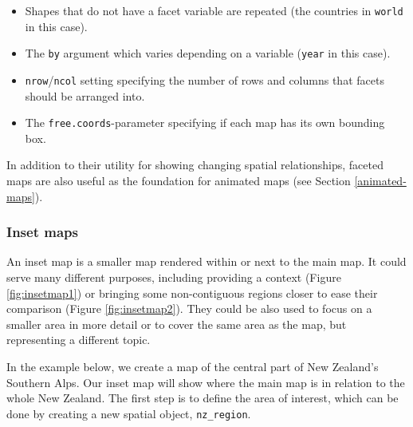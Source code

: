 \documentclass[]{krantz}
\newenvironment{Shaded}{\begin{snugshade}}{\end{snugshade}}
\newcommand{\DataTypeTok}[1]{\textcolor[rgb]{0.27,0.27,0.27}{#1}}
\newcommand{\DecValTok}[1]{\textcolor[rgb]{0.06,0.06,0.06}{#1}}
\newcommand{\KeywordTok}[1]{\textcolor[rgb]{0.27,0.27,0.27}{\textbf{#1}}}
\newcommand{\NormalTok}[1]{#1}
\newcommand{\OperatorTok}[1]{\textcolor[rgb]{0.43,0.43,0.43}{\textbf{#1}}}
\newcommand{\StringTok}[1]{\textcolor[rgb]{0.5,0.5,0.5}{#1}}
\providecommand{\tightlist}{%
  \setlength{\itemsep}{0pt}\setlength{\parskip}{0pt}}
\begin{document}
\begin{itemize}
\tightlist
\item
  Shapes that do not have a facet variable are repeated (the countries in \texttt{world} in this case).
\item
  The \texttt{by} argument which varies depending on a variable (\texttt{year} in this case).
\item
  \texttt{nrow}/\texttt{ncol} setting specifying the number of rows and columns that facets should be arranged into.
\item
  The \texttt{free.coords}-parameter specifying if each map has its own bounding box.
\end{itemize}

In addition to their utility for showing changing spatial relationships, faceted maps are also useful as the foundation for animated maps (see Section \ref{animated-maps}).

\hypertarget{inset-maps}{%
\subsubsection{Inset maps}\label{inset-maps}}

An inset map is a smaller map rendered within or next to the main map.
It could serve many different purposes, including providing a context (Figure \ref{fig:insetmap1}) or bringing some non-contiguous regions closer to ease their comparison (Figure \ref{fig:insetmap2}).
They could be also used to focus on a smaller area in more detail or to cover the same area as the map, but representing a different topic.

In the example below, we create a map of the central part of New Zealand's Southern Alps.
Our inset map will show where the main map is in relation to the whole New Zealand.
The first step is to define the area of interest, which can be done by creating a new spatial object, \texttt{nz\_region}.

\begin{Shaded}
\end{Shaded}
\end{document}
